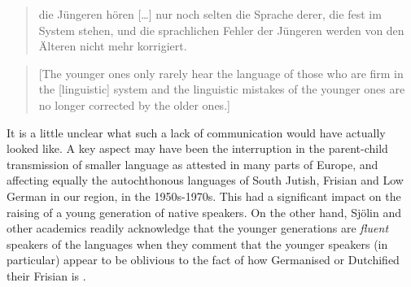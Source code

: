 \documentclass[output=paper]{langsci/langscibook}
\begin{document}
\begin{quote}
die Jüngeren hören […] nur noch selten die Sprache derer, die fest im System stehen, und die sprachlichen Fehler der Jüngeren werden von den Älteren nicht mehr korrigiert. \citep[470]{Sjolin1997}
\end{quote}

\begin{quote}
[The younger ones only rarely hear the language of those who are firm in the [linguistic] system and the linguistic mistakes of the younger ones are no longer corrected by the older ones.]
\end{quote}

It is a little unclear what such a lack of communication would have actually looked like. A key aspect may have been the interruption in the parent-child transmission of smaller language as attested in many parts of Europe, and affecting equally the autochthonous languages of South Jutish, Frisian and Low German in our region, in the 1950s-1970s. This had a significant impact on the raising of a young generation of native speakers. On the other hand, Sjölin and other academics readily acknowledge that the younger generations are \textit{fluent} speakers of the languages when they comment that the younger speakers (in particular) appear to be oblivious to the fact of how Germanised or Dutchified their Frisian is \citep[471]{Sjolin1997}. 
\end{document}
